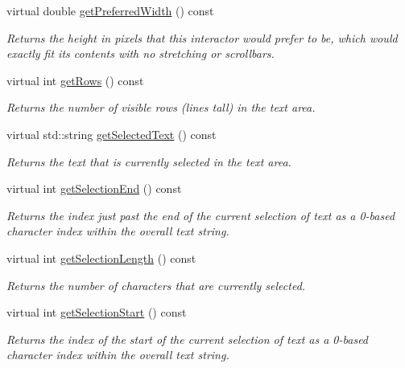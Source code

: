 \begin{DoxyCompactItemize}
virtual double \mbox{\hyperlink{classsgl_1_1GInteractor_a82bca31d37700fb0e35d2743352efd5e}{get\+Preferred\+Width}} () const
\begin{DoxyCompactList}\small\item\em Returns the height in pixels that this interactor would prefer to be, which would exactly fit its contents with no stretching or scrollbars. \end{DoxyCompactList}\item 
virtual int \mbox{\hyperlink{classsgl_1_1GTextArea_ad343f9bbb050d9037167e80e423ab4e8}{get\+Rows}} () const
\begin{DoxyCompactList}\small\item\em Returns the number of visible rows (lines tall) in the text area. \end{DoxyCompactList}\item 
virtual std\+::string \mbox{\hyperlink{classsgl_1_1GTextArea_a512371b3f41599349f23389825a6ccf7}{get\+Selected\+Text}} () const
\begin{DoxyCompactList}\small\item\em Returns the text that is currently selected in the text area. \end{DoxyCompactList}\item 
virtual int \mbox{\hyperlink{classsgl_1_1GTextArea_a2885313daa0e367cee2ccd0c704a6147}{get\+Selection\+End}} () const
\begin{DoxyCompactList}\small\item\em Returns the index just past the end of the current selection of text as a 0-\/based character index within the overall text string. \end{DoxyCompactList}\item 
virtual int \mbox{\hyperlink{classsgl_1_1GTextArea_a68f7816694269b73e6284e756eb0c179}{get\+Selection\+Length}} () const
\begin{DoxyCompactList}\small\item\em Returns the number of characters that are currently selected. \end{DoxyCompactList}\item 
virtual int \mbox{\hyperlink{classsgl_1_1GTextArea_aad7c986a677c1b9cf445cd7cfb6a8975}{get\+Selection\+Start}} () const
\begin{DoxyCompactList}\small\item\em Returns the index of the start of the current selection of text as a 0-\/based character index within the overall text string. \end{DoxyCompactList}\item 

\end{DoxyCompactItemize}
